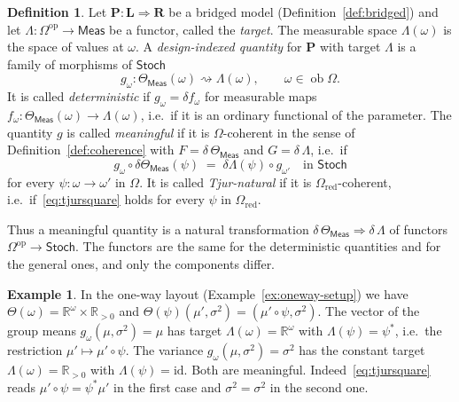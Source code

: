 \documentclass[11pt,a4paper]{article}
\theoremstyle{plain}
\theoremstyle{definition}
\newtheorem{definition}[theorem]{Definition}
\newtheorem{example}[theorem]{Example}
\theoremstyle{remark}
\newcommand{\cat}[1]{\mathsf{#1}}
\newcommand{\catO}{\cat{\Omega}}
\newcommand{\Meas}{\cat{Meas}}
\newcommand{\Stoch}{\cat{Stoch}}
\newcommand{\op}{\mathrm{op}}
\newcommand{\id}{\mathrm{id}}
\newcommand{\del}{\delta}
\newcommand{\R}{\mathbb{R}}
\DeclareMathOperator{\ob}{ob}
\begin{document}
\begin{definition}\label{def:meaningful}
Let $\mathbf{P} \colon \mathbf{L} \Rightarrow \mathbf{R}$ be a bridged model
(Definition~\ref{def:bridged}) and let
$\Lambda \colon \catO^{\op} \to \Meas$ be a functor, called the \emph{target}.
The measurable space $\Lambda(\omega)$ is the space of values at $\omega$.
A \emph{design-indexed quantity} for $\mathbf P$ with target $\Lambda$ is a
family of morphisms of $\Stoch$
\[
g_{\omega} \colon \Theta_\Meas(\omega) \rightsquigarrow \Lambda(\omega),
\qquad \omega \in \ob\catO .
\]
It is called \emph{deterministic} if $g_{\omega} = \del f_{\omega}$ for
measurable maps
$f_{\omega} \colon \Theta_\Meas(\omega) \to \Lambda(\omega)$, i.e.\ if it is an
ordinary functional of the parameter. The quantity $g$ is called
\emph{meaningful} if it is $\catO$-coherent in the sense of
Definition~\ref{def:coherence} with $F = \del\,\Theta_\Meas$ and
$G = \del\,\Lambda$, i.e.\ if
\begin{equation}\label{eq:tjursquare}
g_{\omega} \circ \del\Theta_\Meas(\psi) \;=\; \del\Lambda(\psi) \circ
g_{\omega'}
\quad\text{in } \Stoch
\end{equation}
for every $\psi \colon \omega \to \omega'$ in $\catO$. It is called
\emph{Tjur-natural} if it is $\catO_{\mathrm{red}}$-coherent, i.e.\
if~\eqref{eq:tjursquare} holds for every $\psi$ in $\catO_{\mathrm{red}}$.
\end{definition}

Thus a meaningful quantity is a natural transformation
$\del\,\Theta_\Meas \Rightarrow \del\,\Lambda$ of functors
$\catO^{\op} \to \Stoch$. The functors are the same for the deterministic
quantities and for the general ones, and only the components differ.

\begin{example}\label{ex:targets}
In the one-way layout (Example~\ref{ex:oneway-setup}) we have
$\Theta(\omega) = \R^{\omega} \times \R_{>0}$ and
$\Theta(\psi)(\mu',\sigma^{2}) = (\mu' \circ \psi, \sigma^{2})$. The vector of
the group means $g_{\omega}(\mu,\sigma^{2}) = \mu$ has target
$\Lambda(\omega) = \R^{\omega}$ with $\Lambda(\psi) = \psi^{*}$, i.e.\ the
restriction $\mu' \mapsto \mu' \circ \psi$. The variance
$g_{\omega}(\mu,\sigma^{2}) = \sigma^{2}$ has the constant target
$\Lambda(\omega) = \R_{>0}$ with $\Lambda(\psi) = \id$. Both are meaningful.
Indeed~\eqref{eq:tjursquare} reads $\mu' \circ \psi = \psi^{*}\mu'$ in the
first case and $\sigma^{2} = \sigma^{2}$ in the second one.
\end{example}
\end{document}
